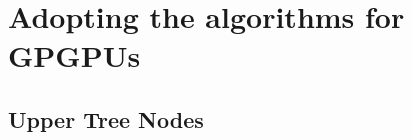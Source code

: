 





\section{Adopting the algorithms for GPGPUs}





\subsection{Upper Tree Nodes}\label{sec:upperNodes}




